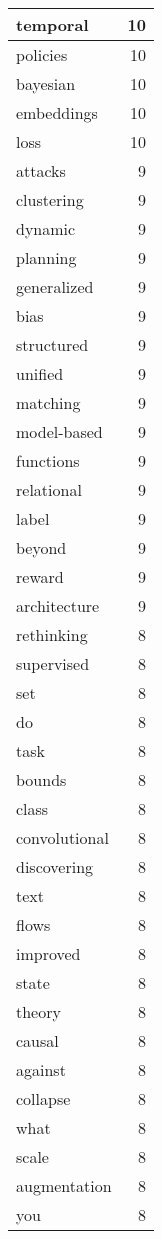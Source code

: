\begin{table}[h]
\begin{tabular}{|l|r|}
\hline
temporal & 10 \\
\hline
policies & 10 \\
\hline
bayesian & 10 \\
\hline
embeddings & 10 \\
\hline
loss & 10 \\
\hline
attacks & 9 \\
\hline
clustering & 9 \\
\hline
dynamic & 9 \\
\hline
planning & 9 \\
\hline
generalized & 9 \\
\hline
bias & 9 \\
\hline
structured & 9 \\
\hline
unified & 9 \\
\hline
matching & 9 \\
\hline
model-based & 9 \\
\hline
functions & 9 \\
\hline
relational & 9 \\
\hline
label & 9 \\
\hline
beyond & 9 \\
\hline
reward & 9 \\
\hline
architecture & 9 \\
\hline
rethinking & 8 \\
\hline
supervised & 8 \\
\hline
set & 8 \\
\hline
do & 8 \\
\hline
task & 8 \\
\hline
bounds & 8 \\
\hline
class & 8 \\
\hline
convolutional & 8 \\
\hline
discovering & 8 \\
\hline
text & 8 \\
\hline
flows & 8 \\
\hline
improved & 8 \\
\hline
state & 8 \\
\hline
theory & 8 \\
\hline
causal & 8 \\
\hline
against & 8 \\
\hline
collapse & 8 \\
\hline
what & 8 \\
\hline
scale & 8 \\
\hline
augmentation & 8 \\
\hline
you & 8 \\

\end{tabular}
\end{table}
